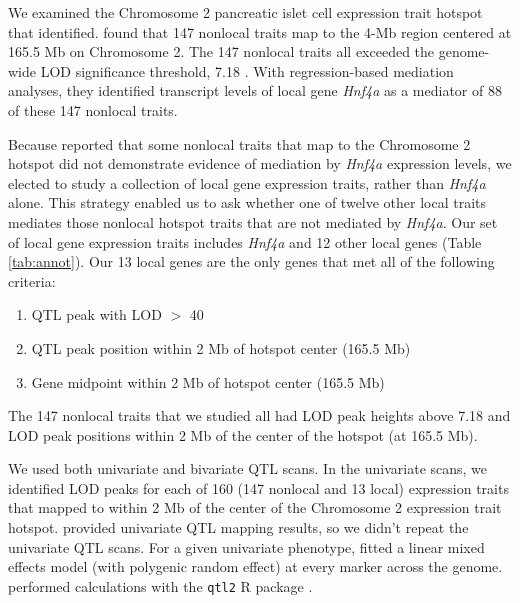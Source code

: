 \documentclass[oneside]{book}
\newenvironment{frameenv}[1]
    {\begin{myfloat}[tb]
    \begin{mdframed}[roundcorner=10pt,backgroundcolor=blue!10]
    \caption{#1}
    }
    {%
    \end{mdframed}\end{myfloat}
    }
\begin{document}
We examined the Chromosome 2 pancreatic islet cell expression trait hotspot that \citet{keller2018genetic} identified. \citet{keller2018genetic} found that 147 nonlocal traits map to the 4-Mb region centered at 165.5 Mb on Chromosome 2. The 147 nonlocal traits all exceeded the genome-wide LOD significance threshold, 7.18 \citep{keller2018genetic}. With regression-based mediation analyses, they identified transcript levels of local gene \emph{Hnf4a} as a mediator of 88 of these 147 nonlocal traits.

Because \citet{keller2018genetic} reported that some nonlocal traits that map to the Chromosome 2 hotspot did not demonstrate evidence of mediation by \emph{Hnf4a} expression levels, we elected to study a collection of local gene expression traits, rather than \emph{Hnf4a} alone. This strategy enabled us to ask whether one of twelve other local traits mediates those nonlocal hotspot traits that are not mediated by \emph{Hnf4a}. Our set of local gene expression traits includes \emph{Hnf4a} and 12 other local genes (Table \ref{tab:annot}). Our 13 local genes are the only genes that met all of the following criteria:

\begin{frameenv}{Local gene inclusion criteria}\label{frame2}

\begin{enumerate}
    \item QTL peak with LOD $>$ 40
    \item QTL peak position within 2 Mb of hotspot center (165.5 Mb)
    \item Gene midpoint within 2 Mb of hotspot center (165.5 Mb)
\end{enumerate}
\end{frameenv}

The 147 nonlocal traits that we studied all had LOD peak heights above 7.18 and LOD peak positions within 2 Mb of the center of the hotspot (at 165.5 Mb).




We used both univariate and bivariate QTL scans. In the univariate scans, we identified LOD peaks for each of 160 (147 nonlocal and 13 local) expression traits that mapped to within 2 Mb of the center of the Chromosome 2 expression trait hotspot. \citet{keller2018genetic} provided univariate QTL mapping results, so we didn't repeat the univariate QTL scans. For a given univariate phenotype, \citet{keller2018genetic} fitted a linear mixed effects model (with polygenic random effect) at every marker across the genome. \citet{keller2018genetic} performed calculations with the \texttt{qtl2} R package \citep{broman2019rqtl2}.
\end{document}
